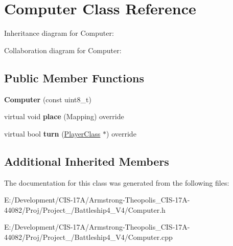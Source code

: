\hypertarget{class_computer}{}\section{Computer Class Reference}
\label{class_computer}


Inheritance diagram for Computer\+:


Collaboration diagram for Computer\+:
\subsection*{Public Member Functions}
\begin{DoxyCompactItemize}
\item 
\mbox{\label{class_computer_acf3070d6c6e4fad94aa7a1f8d0c0ef46}} 
{\bfseries Computer} (const uint8\+\_\+t)
\item 
\mbox{\label{class_computer_afe5a71d4c68f7abfef16f734c72a358f}} 
virtual void {\bfseries place} (Mapping) override
\item 
\mbox{\label{class_computer_afa267191b06696160872ae6e9d357704}} 
virtual bool {\bfseries turn} (\mbox{\hyperlink{class_player_class}{Player\+Class}} $\ast$) override
\end{DoxyCompactItemize}
\subsection*{Additional Inherited Members}


The documentation for this class was generated from the following files\+:\begin{DoxyCompactItemize}
\item 
E\+:/\+Development/\+C\+I\+S-\/17\+A/\+Armstrong-\/\+Theopolis\+\_\+\+C\+I\+S-\/17\+A-\/44082/\+Proj/\+Project\+\_/\+Battleship4\+\_\+\+V4/Computer.\+h\item 
E\+:/\+Development/\+C\+I\+S-\/17\+A/\+Armstrong-\/\+Theopolis\+\_\+\+C\+I\+S-\/17\+A-\/44082/\+Proj/\+Project\+\_/\+Battleship4\+\_\+\+V4/Computer.\+cpp\end{DoxyCompactItemize}
